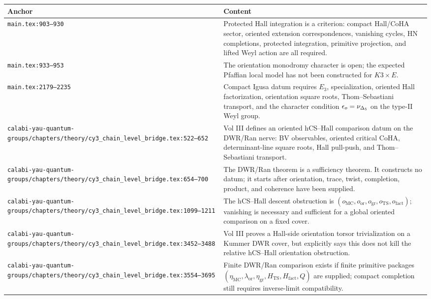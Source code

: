 \begin{center}
\small
\begin{tabular}{p{}p{}}
\hline
Anchor & Content \\
\hline
\texttt{main.tex:903--930} &
Protected Hall integration is a criterion: compact Hall/CoHA sector,
oriented extension correspondences, vanishing cycles, HN completions,
protected integration, primitive projection, and lifted Weyl action are
all required. \\
\texttt{main.tex:933--953} &
The orientation monodromy character is open; the expected Pfaffian local
model has not been constructed for \(K3\times E\). \\
\texttt{main.tex:2179--2235} &
Compact Igusa datum requires \(E_3\), specialization, oriented Hall
factorization, orientation square roots, Thom--Sebastiani transport, and
the character condition \(\epsilon_o=\nu_{\Delta_5}\) on the type-II Weyl group. \\
\texttt{calabi-yau-quantum-groups/chapters/theory/cy3\_chain\_level\_bridge.tex:522--652} &
Vol III defines an oriented hCS--Hall comparison datum on the DWR/Ran
nerve: BV observables, oriented critical CoHA, determinant-line square
roots, Hall pull-push, and Thom--Sebastiani transport. \\
\texttt{calabi-yau-quantum-groups/chapters/theory/cy3\_chain\_level\_bridge.tex:654--700} &
The DWR/Ran theorem is a sufficiency theorem.  It constructs no datum; it
starts after orientation, trace, twist, completion, product, and
coherence have been supplied. \\
\texttt{calabi-yau-quantum-groups/chapters/theory/cy3\_chain\_level\_bridge.tex:1099--1211} &
The hCS--Hall descent obstruction is
\((o_{\mathrm{MC}},o_{\mathrm{or}},o_{\mathrm{gr}},
o_{\mathrm{TS}},o_{\mathrm{fact}})\); vanishing is necessary and
sufficient for a global oriented comparison on a fixed cover. \\
\texttt{calabi-yau-quantum-groups/chapters/theory/cy3\_chain\_level\_bridge.tex:3452--3488} &
Vol III proves a Hall-side orientation torsor trivialization on a Kummer
DWR cover, but explicitly says this does not kill the relative
hCS--Hall orientation obstruction. \\
\texttt{calabi-yau-quantum-groups/chapters/theory/cy3\_chain\_level\_bridge.tex:3554--3695} &
Finite DWR/Ran comparison exists if finite primitive packages
\((\eta_{\mathrm{MC}},\lambda_{\mathrm{or}},\eta_{\mathrm{gr}},
H_{\mathrm{TS}},H_{\mathrm{fact}},Q)\) are supplied; compact completion
still requires inverse-limit compatibility. \\

\end{tabular}
\end{center}
